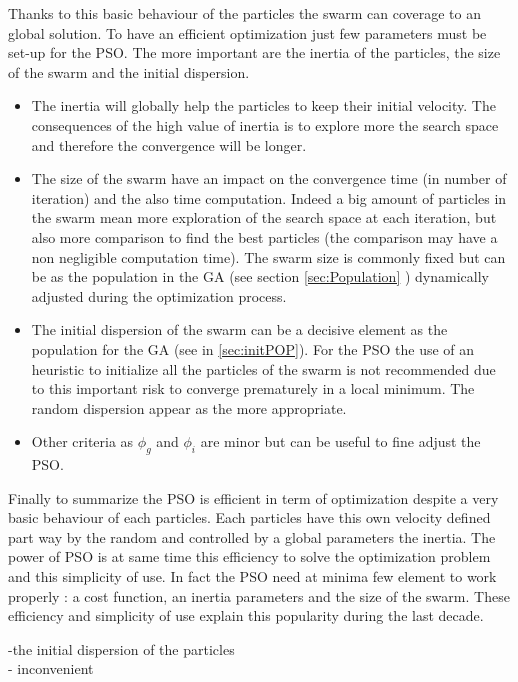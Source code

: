 Thanks to this basic behaviour of the particles the swarm can coverage to an global solution. 
To have an efficient optimization just few parameters must be set-up for the PSO.  
The more important are the inertia of the particles, the size of the swarm and the initial dispersion.
\begin{itemize}
\item The inertia  will globally  help the particles to keep  their  initial velocity. The consequences of the high value of inertia is to explore more the search space and therefore the convergence will be longer. 
\item The size of the swarm  have an impact on the convergence time (in number of iteration) and the also time computation. Indeed a big amount of particles in the swarm  mean more exploration of the search space at each iteration, but also more comparison to find the best particles (the comparison may have a non negligible computation time). 
The swarm size is commonly fixed but can be as the population in the GA (see section \ref{sec:Population} ) dynamically adjusted during the optimization process. 


\item The initial dispersion of the swarm can be a decisive element as the population for the GA (see in \ref{sec:initPOP}). For the PSO the use of an heuristic to initialize all the particles of the swarm is not recommended due to this important risk to converge prematurely in a local minimum. The random dispersion appear  as the more appropriate. 
\item Other criteria as $\phi_g$ and $\phi_i$ are minor but can be useful to fine adjust the PSO.
\end{itemize}

Finally to summarize the PSO is efficient in term of optimization despite a very basic behaviour of each particles. Each particles have this own velocity defined part way by the random and controlled by a global parameters the inertia.
 The power of PSO is at same time this efficiency to solve the optimization problem and this simplicity of use. In fact the PSO need at minima  few element to work properly : a cost function, an inertia parameters and the size of the swarm. These efficiency and simplicity of use explain this popularity during the last decade.
 





-the initial dispersion of the particles \\
- inconvenient 


